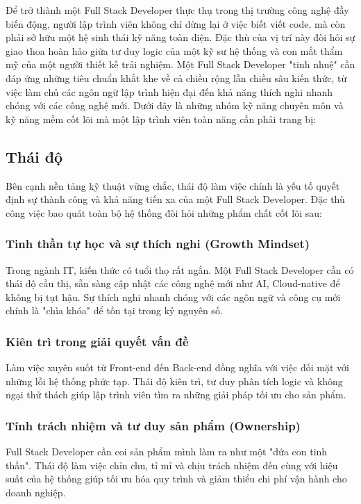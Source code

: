 \documentclass[12pt,a4paper]{article}
\begin{document}
\hspace{0.7cm}Để trở thành một Full Stack Developer thực thụ trong thị trường công nghệ đầy biến động, người lập trình viên không chỉ dừng lại ở việc biết viết code, mà còn phải sở hữu một hệ sinh thái kỹ năng toàn diện. Đặc thù của vị trí này đòi hỏi sự giao thoa hoàn hảo giữa tư duy logic của một kỹ sư hệ thống và con mắt thẩm mỹ của một người thiết kế trải nghiệm. Một Full Stack Developer "tinh nhuệ" cần đáp ứng những tiêu chuẩn khắt khe về cả chiều rộng lẫn chiều sâu kiến thức, từ việc làm chủ các ngôn ngữ lập trình hiện đại đến khả năng thích nghi nhanh chóng với các công nghệ mới. Dưới đây là những nhóm kỹ năng chuyên môn và kỹ năng mềm cốt lõi mà một lập trình viên toàn năng cần phải trang bị:

\subsection{Thái độ}

\hspace{0.7cm}Bên cạnh nền tảng kỹ thuật vững chắc, thái độ làm việc chính là yếu tố quyết định sự thành công và khả năng tiến xa của một Full Stack Developer. Đặc thù công việc bao quát toàn bộ hệ thống đòi hỏi những phẩm chất cốt lõi sau:
\subsubsection{Tinh thần tự học và sự thích nghi (Growth Mindset)}
\hspace{0.7cm}Trong ngành IT, kiến thức có tuổi thọ rất ngắn. Một Full Stack Developer cần có thái độ cầu thị, sẵn sàng cập nhật các công nghệ mới như AI, Cloud-native để không bị tụt hậu. Sự thích nghi nhanh chóng với các ngôn ngữ và công cụ mới chính là "chìa khóa" để tồn tại trong kỷ nguyên số.
\subsubsection{Kiên trì trong giải quyết vấn đề}
\hspace{0.7cm}Làm việc xuyên suốt từ Front-end đến Back-end đồng nghĩa với việc đối mặt với những lỗi hệ thống phức tạp. Thái độ kiên trì, tư duy phân tích logic và không ngại thử thách giúp lập trình viên tìm ra những giải pháp tối ưu cho sản phẩm.
\subsubsection{Tính trách nhiệm và tư duy sản phẩm (Ownership)}
\hspace{0.7cm}Full Stack Developer cần coi sản phẩm mình làm ra như một "đứa con tinh thần". Thái độ làm việc chỉn chu, tỉ mỉ và chịu trách nhiệm đến cùng với hiệu suất của hệ thống giúp tối ưu hóa quy trình và giảm thiểu chi phí vận hành cho doanh nghiệp.
\end{document}
